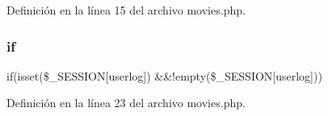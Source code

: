 Definición en la línea 15 del archivo movies.\+php.

\mbox{\label{movies_8php_aefb5893336d7ead40ae915367f4b82cc}} 
\subsubsection{\texorpdfstring{if}{if}}
{\footnotesize\ttfamily if(isset(\$\+\_\+\+S\+E\+S\+S\+I\+ON\mbox{[}\textquotesingle{}userlog\textquotesingle{}\mbox{]}) \&\&!empty(\$\+\_\+\+S\+E\+S\+S\+I\+ON\mbox{[}\textquotesingle{}userlog\textquotesingle{}\mbox{]}))}



Definición en la línea 23 del archivo movies.\+php.


